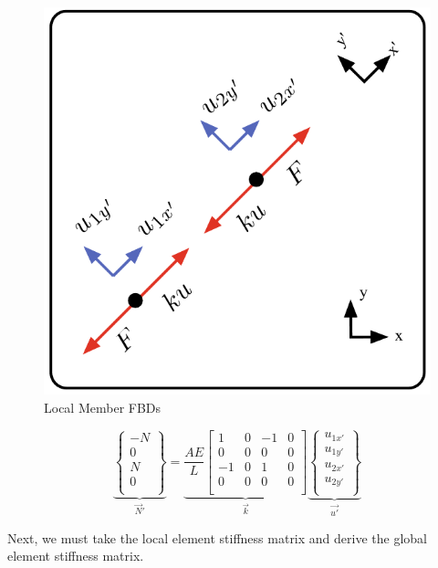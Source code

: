 \begin{center}
	\begin{figure}[h]	\centerline{\includegraphics[width=0.7\columnwidth]{Figures/LocalMemberStiffness}}
		\caption{Local Member FBDs}
		\label{fig:LocalMemberStiffness}
	\end{figure}
\end{center}


\begin{equation}
	\underbrace{
		\begin{Bmatrix}
			-N\\ 0\\ \hline N\\ 0\\
		\end{Bmatrix}
	}_{\vec{N}'}
	=
	\underbrace{
		\frac{AE}{L}
		\begin{bmatrix}
			1 & 0 & -1 & 0\\
			0 & 0 & 0 & 0\\
			-1 & 0 & 1 & 0\\
			0 & 0 & 0 & 0\\
		\end{bmatrix}
	}_{\vec{k}}
	\underbrace{
		\begin{Bmatrix}
			u_{1x'}\\ u_{1y'}\\ \hline u_{2x'}\\ u_{2y'}\\
		\end{Bmatrix}
	}_{\vec{u'}}
	\label{Eq:F=ku}
\end{equation}

Next, we must take the local element stiffness matrix and derive the global element stiffness matrix.

